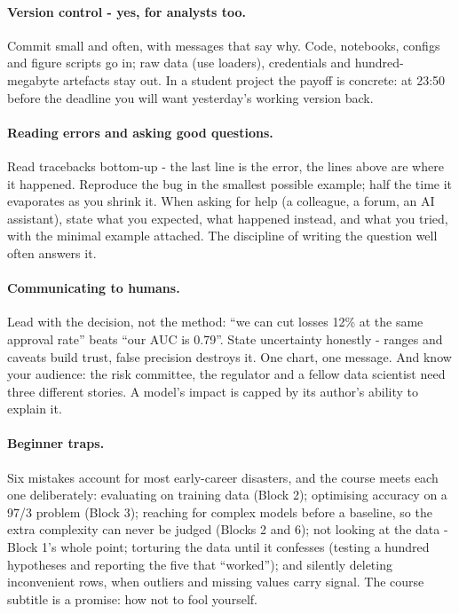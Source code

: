 \documentclass[11pt,a4paper]{article}
\begin{document}
\paragraph{Version control - yes, for analysts too.} Commit small and
often, with messages that say why. Code, notebooks, configs and figure
scripts go in; raw data (use loaders), credentials and hundred-megabyte
artefacts stay out. In a student project the payoff is concrete: at 23:50
before the deadline you will want yesterday's working version back.

\paragraph{Reading errors and asking good questions.} Read tracebacks
bottom-up - the last line is the error, the lines above are where it
happened. Reproduce the bug in the smallest possible example; half the time
it evaporates as you shrink it. When asking for help (a colleague, a forum,
an AI assistant), state what you expected, what happened instead, and what
you tried, with the minimal example attached. The discipline of writing the
question well often answers it.

\paragraph{Communicating to humans.} Lead with the decision, not the method:
``we can cut losses 12\% at the same approval rate'' beats ``our AUC is
0.79''. State uncertainty honestly - ranges and caveats build trust, false
precision destroys it. One chart, one message. And know your audience: the
risk committee, the regulator and a fellow data scientist need three
different stories. A model's impact is capped by its author's ability to
explain it.

\paragraph{Beginner traps.} Six mistakes account for most early-career
disasters, and the course meets each one deliberately: evaluating on
training data (Block 2); optimising accuracy on a 97/3 problem (Block 3);
reaching for complex models before a baseline, so the extra complexity can
never be judged (Blocks 2 and 6); not looking at the data - Block 1's
whole point; torturing the data until it confesses (testing a hundred
hypotheses and reporting the five that ``worked''); and silently deleting
inconvenient rows, when outliers and missing values carry signal. The course
subtitle is a promise: how not to fool yourself.
\end{document}
